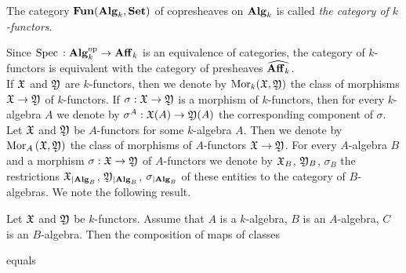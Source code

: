 \begin{definition}
The category $\mathbf{Fun}(\mathbf{Alg}_k,\mathbf{Set})$ of copresheaves on $\mathbf{Alg}_k$ is called \textit{the category of $k$-functors}.
\end{definition}
\noindent
Since $\mathrm{Spec}\,:\mathbf{Alg}_k^{\mathrm{op}} \rightarrow \mathbf{Aff}_k$ is an equivalence of categories, the category of $k$-functors is equivalent with the category of presheaves $\widehat{\mathbf{Aff}_k}$.\\
If ${\mathfrak X}$ and ${\mathfrak Y}$ are $k$-functors, then we denote by $\mathrm{Mor}_k({\mathfrak X},{\mathfrak Y})$ the class of morphisms ${\mathfrak X}\rightarrow {\mathfrak Y}$ of $k$-functors. If $\sigma:{\mathfrak X}\rightarrow {\mathfrak Y}$ is a morphism of $k$-functors, then for every $k$-algebra $A$ we denote by $\sigma^A:{\mathfrak X}(A)\rightarrow {\mathfrak Y}(A)$ the corresponding component of $\sigma$.\\
Let ${\mathfrak X}$ and ${\mathfrak Y}$ be $A$-functors for some $k$-algebra $A$. Then we denote by $\mathrm{Mor}_A\left({\mathfrak X},{\mathfrak Y}\right)$ the class of morphisms of $A$-functors ${\mathfrak X}\rightarrow {\mathfrak Y}$. For every $A$-algebra $B$ and a morphism $\sigma:{\mathfrak X}\rightarrow {\mathfrak Y}$ of $A$-functors we denote by ${\mathfrak X}_{B}$, ${\mathfrak Y}_{B}$, $\sigma_{B}$ the restrictions ${\mathfrak X}_{\mid \mathbf{Alg}_B}$, ${\mathfrak Y}_{\mid \mathbf{Alg}_B}$, $\sigma_{\mid \mathbf{Alg}_B}$ of these entities to the category of $B$-algebras. We note the following result.

\begin{fact}\label{fact:restriction_works_as_expected}
Let ${\mathfrak X}$ and ${\mathfrak Y}$ be $k$-functors. Assume that $A$ is a $k$-algebra, $B$ is an $A$-algebra, $C$ is an $B$-algebra. Then the composition of maps of classes
\begin{center}
\end{center}
equals
\begin{center}
\end{center}
\end{fact}

